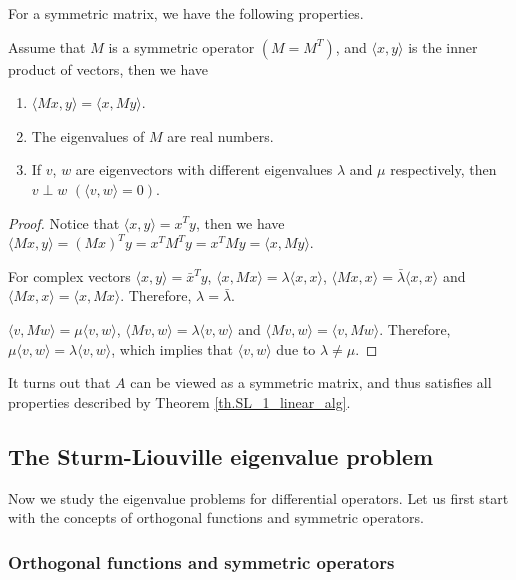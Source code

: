 For a symmetric matrix, we have the following properties.

\begin{theorem}[]\label{th.SL_1_linear_alg} Assume that $M$ is a symmetric operator $(M = M^{T})$, and $\langle x, y\rangle$ is the inner product of vectors, then we have
\begin{enumerate}
    \item $\langle M x, y\rangle = \langle x, My\rangle$.
    \item The eigenvalues of $M$ are real numbers.
    \item If $v$, $w$ are eigenvectors with different eigenvalues $\lambda$ and $\mu$ respectively, then $v\perp w$ $(\langle v, w\rangle = 0)$.
\end{enumerate}
\end{theorem}
\begin{proof}
    Notice that $\langle x, y\rangle = x^T y$, then we have $\langle M x, y\rangle = (M x)^T y = x^T M^T y = x^T M y = \langle x, My\rangle$.

    For complex vectors $\langle x, y\rangle = \bar{x}^T y$, $\langle x, M x\rangle = \lambda\langle x, x\rangle$, $\langle M x, x\rangle = \bar{\lambda}\langle x, x\rangle$ and $\langle M x, x\rangle = \langle x, Mx\rangle$. Therefore, $\lambda = \bar{\lambda}$. 

    $\langle v, M w\rangle = \mu\langle v, w\rangle$, $\langle M v, w\rangle = \lambda\langle v, w\rangle$ and $\langle M v, w\rangle = \langle v, Mw\rangle$. Therefore, $\mu\langle v, w\rangle = \lambda \langle v, w\rangle$, which implies that $\langle v, w\rangle$ due to $\lambda\neq\mu$.
\end{proof}


It turns out that $A$ can be viewed as a symmetric matrix, and thus satisfies all properties described by Theorem \ref{th.SL_1_linear_alg}.


\subsection{The Sturm-Liouville eigenvalue problem}

Now we study the eigenvalue problems for differential operators. Let us first start with the concepts of orthogonal functions and symmetric operators. 

\subsubsection{Orthogonal functions and symmetric operators}

